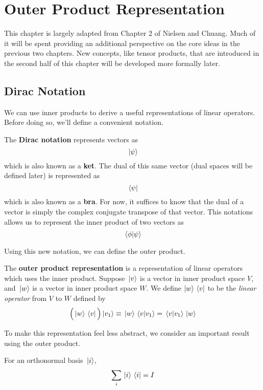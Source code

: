 \chapter{Outer Product Representation} 

This chapter is largely adapted from Chapter 2 of Nielsen and Chuang. Much of it will be spent providing an additional perspective on the core ideas in the previous two chapters. New concepts, like tensor products, that are introduced in the second half of this chapter will be developed more formally later. 
\section{Dirac Notation} 

We can use inner products to derive a useful representations of linear operators. Before doing so, we'll define a convenient notation. 

\begin{definition}
The \textbf{Dirac notation} represents vectors as 
$$\ket*{\psi}$$ which is also known as a \textbf{ket}. The dual of this same vector (dual spaces will be defined later) is represented as 
$$\bra*{\psi}$$ which is also known as a \textbf{bra}. For now, it suffices to know that the dual of a vector is simply the complex conjugate transpose of that vector. This notations allows us to represent the inner product of two vectors as 
$$\bra*{\phi}\ket*{\psi}$$
\end{definition}

Using this new notation, we can define the outer product. 

\begin{definition}
The \textbf{outer product representation} is a representation of linear operators which uses the inner product. Suppose $\ket*{v}$ is a vector in inner product space $V$, and $\ket*{w}$ is a vector in inner product space $W$. We define $\ket{w} \bra*{v}$ to be the \textit{linear operator} from $V$ to $W$ defined by 
$$\Big(\ket*{w} \bra*{v} \Big) \ket*{v_{1}} \equiv \ket*{w} \bra*{v} \ket*{v_{1}} = \bra*{v} \ket*{v_{1}} \ket*{w}$$
\end{definition}

To make this representation feel less abstract, we consider an important result using the outer product. 

\begin{lemma}
For an orthonormal basis $\ket*{i}$, 
$$\sum_{i} \ket*{i} \bra*{i} = I$$
\end{lemma}

